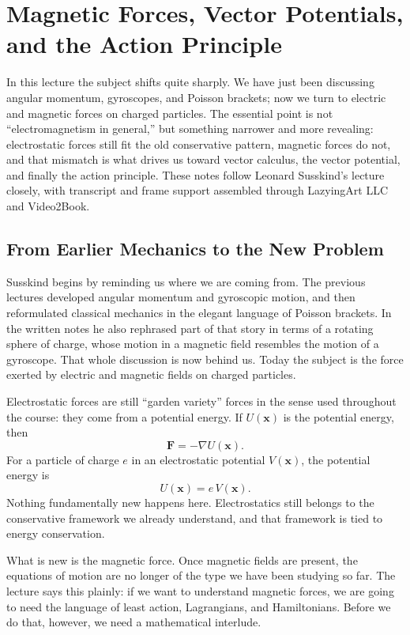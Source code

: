 \chapter{Magnetic Forces, Vector Potentials, and the Action Principle}

In this lecture the subject shifts quite sharply. We have just been discussing angular momentum, gyroscopes, and Poisson brackets; now we turn to electric and magnetic forces on charged particles. The essential point is not ``electromagnetism in general,'' but something narrower and more revealing: electrostatic forces still fit the old conservative pattern, magnetic forces do not, and that mismatch is what drives us toward vector calculus, the vector potential, and finally the action principle. These notes follow Leonard Susskind's lecture closely, with transcript and frame support assembled through LazyingArt LLC and Video2Book.

\section{From Earlier Mechanics to the New Problem}

Susskind begins by reminding us where we are coming from. The previous lectures developed angular momentum and gyroscopic motion, and then reformulated classical mechanics in the elegant language of Poisson brackets. In the written notes he also rephrased part of that story in terms of a rotating sphere of charge, whose motion in a magnetic field resembles the motion of a gyroscope. That whole discussion is now behind us. Today the subject is the force exerted by electric and magnetic fields on charged particles.

Electrostatic forces are still ``garden variety'' forces in the sense used throughout the course: they come from a potential energy. If \(U(\mathbf x)\) is the potential energy, then
\begin{equation}
\mathbf F=-\nabla U(\mathbf x).
\end{equation}
For a particle of charge \(e\) in an electrostatic potential \(V(\mathbf x)\), the potential energy is
\begin{equation}
U(\mathbf x)=e\,V(\mathbf x).
\end{equation}
Nothing fundamentally new happens here. Electrostatics still belongs to the conservative framework we already understand, and that framework is tied to energy conservation.

What is new is the magnetic force. Once magnetic fields are present, the equations of motion are no longer of the type we have been studying so far. The lecture says this plainly: if we want to understand magnetic forces, we are going to need the language of least action, Lagrangians, and Hamiltonians. Before we do that, however, we need a mathematical interlude.

